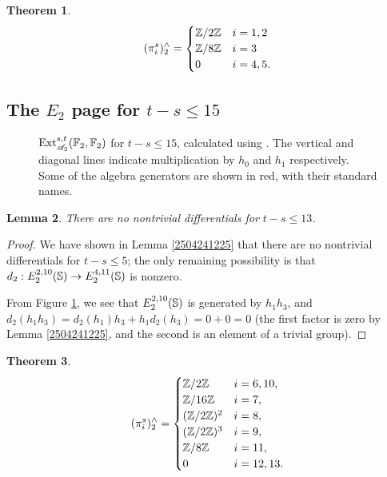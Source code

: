 \documentclass[11pt, titlepage]{article} %
\def\bb{\ensuremath\mathbb}
\def\inte{\ensuremath\mathbb{Z}}
\def\A{\ensuremath{\mathscr{A}_2}}
\DeclareMathOperator{\Ext}{Ext}
\numberwithin{equation}{subsection}
\theoremstyle{plain}
\newtheorem{theorem}{Theorem}[subsection]
\newtheorem{lemma}[theorem]{Lemma}
\theoremstyle{definition}
\begin{document}
\begin{theorem}
\begin{align*}
(\pi_i^s)^\wedge_2 = \begin{cases}
\inte/2\inte & i = 1, 2\\
\inte/8\inte & i = 3\\
0 & i = 4, 5.
\end{cases}
\end{align*}
\end{theorem}

\subsection{The \(E_2\) page for \(t-s\leq 15\)}\label{2504291252}

\begin{figure}
\centering

\caption[\(\Ext_{\A}^{s,t}(\bb{F}_2, \bb{F}_2)\) for \(t-s\leq 18\).]{\(\Ext_{\A}^{s,t}(\bb{F}_2, \bb{F}_2)\) for \(t-s\leq 15\), calculated using \autocite{sseq}. The vertical and diagonal lines indicate multiplication by \(h_0\) and \(h_1\) respectively. Some of the algebra generators are shown in red, with their standard names.}
\label{1304251243}
\end{figure}

\begin{lemma}
There are no nontrivial differentials for \(t-s\leq 13\). 
\end{lemma}

\begin{proof}
We have shown in Lemma \ref{2504241225} that there are no nontrivial differentials for \(t-s\leq 5\); the only remaining possibility is that \(d_2 : E_2^{2, 10}(\bb{S}) \to E_2^{4, 11}(\bb{S})\) is nonzero.

From Figure \ref{1304251243}, we see that \(E^{2, 10}_2(\bb{S})\) is generated by \(h_1h_3\), and \(d_2(h_1h_3)=d_2(h_1)h_3+h_1d_2(h_3)=0+0=0\) (the first factor is zero by Lemma \ref{2504241225}, and the second is an element of a trivial group). 
\end{proof}

\begin{theorem}
\[(\pi_i^s)^\wedge_2=\begin{cases}
\inte/2\inte & i = 6, 10,\\
\inte/16\inte & i = 7,\\
(\inte/2\inte)^2 & i = 8,\\
(\inte/2\inte)^3 & i = 9,\\
\inte/8\inte & i = 11,\\
0 & i = 12, 13.
\end{cases}\]
\end{theorem}
\end{document}
